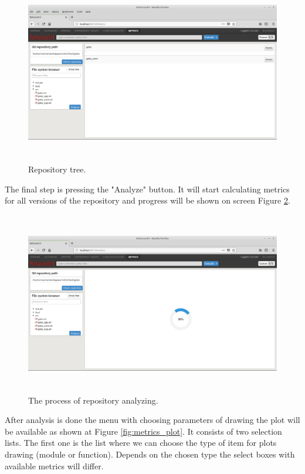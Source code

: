 \begin{figure}[ht]
	\includegraphics[height=80mm]{figures/files.png}
	\caption{Repository tree.}
	\label{fig:metrics_files}
\end{figure}

The final step is pressing the "Analyze" button. It will start calculating metrics for all versions of the repository and progress will be shown on screen Figure \ref{fig:metrics_analyze}. 

\begin{figure}[ht]
	\includegraphics[height=80mm]{figures/analyze.png}
	\caption{The process of repository analyzing.}
	\label{fig:metrics_analyze}
\end{figure}

After analysis is done the menu with choosing parameters of drawing the plot will be available as shown at Figure \ref{fig:metrics_plot}. It consists of two selection lists. The first one is the list where we can choose the type of item for plots drawing (module or function). Depends on the chosen type the select boxes with available metrics will differ. 

